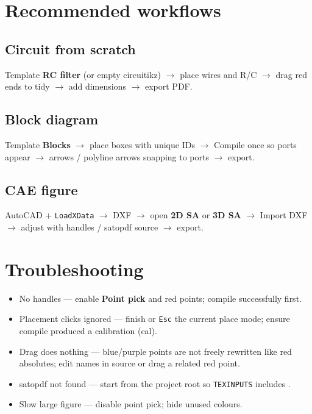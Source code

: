 \documentclass[a4paper]{ltxdoc}
\newcommand{\ui}[1]{\textbf{#1}}
\newcommand{\key}[1]{\texttt{#1}}
\begin{document}
\section{Recommended workflows}

\subsection{Circuit from scratch}
Template \ui{RC filter} (or empty circuitikz) $\rightarrow$ place wires and
R/C $\rightarrow$ drag red ends to tidy $\rightarrow$ add dimensions $\rightarrow$
export PDF.

\subsection{Block diagram}
Template \ui{Blocks} $\rightarrow$ place boxes with unique IDs $\rightarrow$
Compile once so ports appear $\rightarrow$ arrows / polyline arrows snapping
to ports $\rightarrow$ export.

\subsection{CAE figure}
AutoCAD + \texttt{LoadXData} $\rightarrow$ DXF $\rightarrow$ open
\ui{2D SA} or \ui{3D SA} $\rightarrow$ Import DXF $\rightarrow$ adjust with
handles / \textsf{satopdf} source $\rightarrow$ export.

\section{Troubleshooting}

\begin{itemize}[nosep]
  \item No handles --- enable \ui{Point pick} and red points; compile
        successfully first.
  \item Placement clicks ignored --- finish or \key{Esc} the current
        place mode; ensure compile produced a calibration (cal).
  \item Drag does nothing --- blue/purple points are not freely rewritten
        like red absolutes; edit names in source or drag a related red
        point.
  \item \textsf{satopdf} not found --- start from the project root so
        \texttt{TEXINPUTS} includes .
  \item Slow large figure --- disable point pick; hide unused colours.
\end{itemize}
\end{document}

